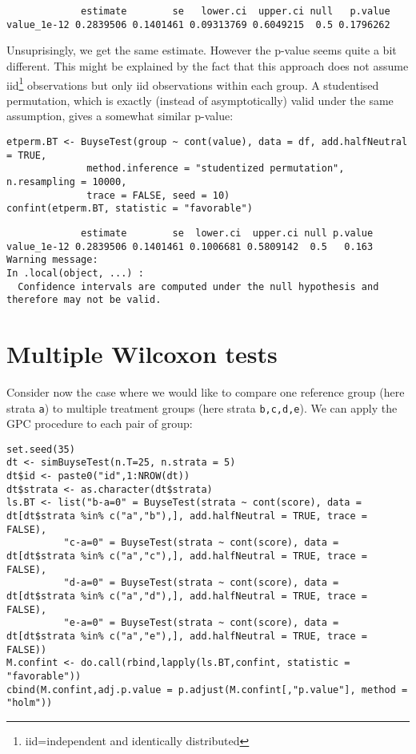 \documentclass[12pt]{article}
\begin{document}
\begin{verbatim}
             estimate        se   lower.ci  upper.ci null   p.value
value_1e-12 0.2839506 0.1401461 0.09313769 0.6049215  0.5 0.1796262
\end{verbatim}


Unsuprisingly, we get the same estimate. However the p-value seems
quite a bit different. This might be explained by the fact that this
approach does not assume iid\footnote{iid=independent and identically
distributed} observations but only iid observations within each
group. A studentised permutation, which is exactly (instead of
asymptotically) valid under the same assumption, gives a somewhat
similar p-value:
\lstset{language=r,label= ,caption= ,captionpos=b,numbers=none}
\begin{lstlisting}
etperm.BT <- BuyseTest(group ~ cont(value), data = df, add.halfNeutral = TRUE,
		      method.inference = "studentized permutation", n.resampling = 10000,
		      trace = FALSE, seed = 10)
confint(etperm.BT, statistic = "favorable")
\end{lstlisting}

\begin{verbatim}
             estimate        se  lower.ci  upper.ci null p.value
value_1e-12 0.2839506 0.1401461 0.1006681 0.5809142  0.5   0.163
Warning message:
In .local(object, ...) :
  Confidence intervals are computed under the null hypothesis and therefore may not be valid.
\end{verbatim}

\section{Multiple Wilcoxon tests}
\label{sec:orgc55ca47}

Consider now the case where we would like to compare one reference
group (here strata \texttt{a}) to multiple treatment groups (here strata
\texttt{b,c,d,e}). We can apply the GPC procedure to each pair of group:
\lstset{language=r,label= ,caption= ,captionpos=b,numbers=none}
\begin{lstlisting}
set.seed(35)
dt <- simBuyseTest(n.T=25, n.strata = 5)
dt$id <- paste0("id",1:NROW(dt))
dt$strata <- as.character(dt$strata) 
ls.BT <- list("b-a=0" = BuyseTest(strata ~ cont(score), data = dt[dt$strata %in% c("a","b"),], add.halfNeutral = TRUE, trace = FALSE),
	      "c-a=0" = BuyseTest(strata ~ cont(score), data = dt[dt$strata %in% c("a","c"),], add.halfNeutral = TRUE, trace = FALSE),
	      "d-a=0" = BuyseTest(strata ~ cont(score), data = dt[dt$strata %in% c("a","d"),], add.halfNeutral = TRUE, trace = FALSE),
	      "e-a=0" = BuyseTest(strata ~ cont(score), data = dt[dt$strata %in% c("a","e"),], add.halfNeutral = TRUE, trace = FALSE))
M.confint <- do.call(rbind,lapply(ls.BT,confint, statistic = "favorable"))
cbind(M.confint,adj.p.value = p.adjust(M.confint[,"p.value"], method = "holm"))
\end{lstlisting}
\end{document}
